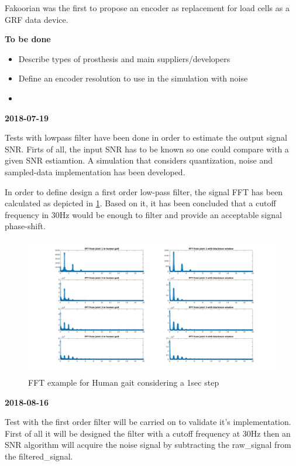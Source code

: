 Fakoorian was the first to propose an encoder as replacement for load cells as a GRF data device.

\textbf{To be done}
\begin{itemize}
    \item Describe types of prosthesis and main suppliers/developers
    \item Define an encoder resolution to use in the simulation with noise
    \item 
\end{itemize}

\textbf{2018-07-19}

Tests with lowpass filter have been done in order to estimate the output signal SNR. Firts of all, the input SNR has to be known so one could compare with 
a given SNR estiamtion. A simulation that considers quantization, noise and sampled-data implementation has been developed.

In order to define design a first order low-pass filter, the signal FFT has been calculated as depicted in \ref{fig:FFT_step}. Based on it, it has been 
concluded that a cutoff frequency in 30Hz would be enough to filter and provide an acceptable signal phase-shift. 
\begin{figure}[h]
    \centering
    \includegraphics[width=\linewidth]{1sec_step_FFT.jpg}
    \caption{FFT example for Human gait considering a 1sec step}
    \label{fig:FFT_step}
\end{figure}

\textbf{2018-08-16}

Test with the first order filter will be carried on to validate it's implementation. First of all
it will be designed the filter with a cutoff frequency at 30Hz then an SNR algorithm will acquire the noise signal
by subtracting the raw\_signal from the filtered\_signal.

